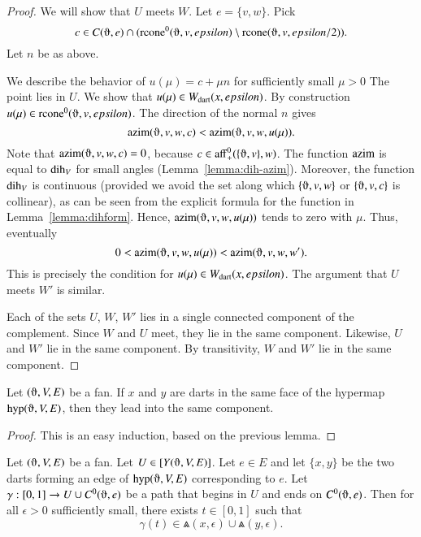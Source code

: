 \begin{proof}
We will show that $U$ meets $W$.    Let $e=\{v,w\}$. Pick 
 $$c\in C(\orgn,e) \cap 
      (\op{rcone}^0(\orgn,v,\epsilon)\setminus \op{rcone}(\orgn,v,\epsilon/2)).
 $$
Let $n$ be as above. 

 We describe the behavior of 
$u(\mu)=c + \mu n$ for sufficiently small $\mu>0$ 
 The point lies in  $U$.  
We show that $u(\mu)\in W_{\text{dart}}(x,epsilon)$.
By construction $u(\mu)\in \op{rcone}^0(\orgn,v,\epsilon)$.
The direction of the normal $n$ gives
   $$
   \op{azim}(\orgn,v,w,c) < \op{azim}(\orgn,v,w,u(\mu)).
   $$
Note that $\op{azim}(\orgn,v,w,c) = 0$, because 
$c\in\op{aff}_+^0(\{\orgn,v\},w)$. 
The function ${\operatorname{azim}}$ is equal to ${\operatorname{dih}}_V$ for
small angles (Lemma~\ref{lemma:dih-azim}).  Moreover,
the function $\operatorname{dih}_V$ is continuous (provided
we avoid the set along which $\{\orgn,v,w\}$ or $\{\orgn,v,c\}$ is
collinear), as can be seen
from the explicit formula 
for the function in Lemma~\ref{lemma:dihform}.
Hence, $\op{azim}(\orgn,v,w,u(\mu))$ tends to zero with $\mu$.
Thus, eventually
   $$
   0 < \op{azim}(\orgn,v,w,u(\mu)) < \op{azim}(\orgn,v,w,w').
   $$
This is precisely the condition for $u(\mu)\in W_{\text{dart}}(x,epsilon)$.
The argument that $U$ meets
$W'$ is similar.

Each of the sets $U$, $W$, $W'$ lies in a single connected
component of the complement.  Since $W$ and $U$ meet, they
lie in the same component.  Likewise, $U$ and $W'$ lie in the
same component.  By transitivity, $W$ and $W'$ lie in the same
component.
\end{proof}

\begin{lemma}
Let $(\orgn,V,E)$ be a fan.
If $x$ and $y$ are darts in the same face of the hypermap
$\op{hyp}(\orgn,V,E)$, then they lead into the same component.
\end{lemma}

\begin{proof}  This is an easy induction, based on the previous
lemma.  
\end{proof}


\begin{lemma}
Let $(\orgn,V,E)$ be a fan.  Let $U\in\comp{Y(\orgn,V,E)}$.  
Let $e\in E$ and let $\{x,y\}$
be the two darts forming an edge of $\op{hyp}(\orgn,V,E)$
corresponding to $e$.  Let $\gamma:[0,1]\to U\cup C^0(\orgn,e)$
be a path that begins in $U$ and ends on $C^0(\orgn,e)$.
Then for all $\epsilon>0$ sufficiently small,
there exists  $t\in[0,1]$ such that
  $$\gamma(t)\in 
  \Wedge(x,\epsilon)
  \cup \Wedge(y,\epsilon).
  $$
\end{lemma}

